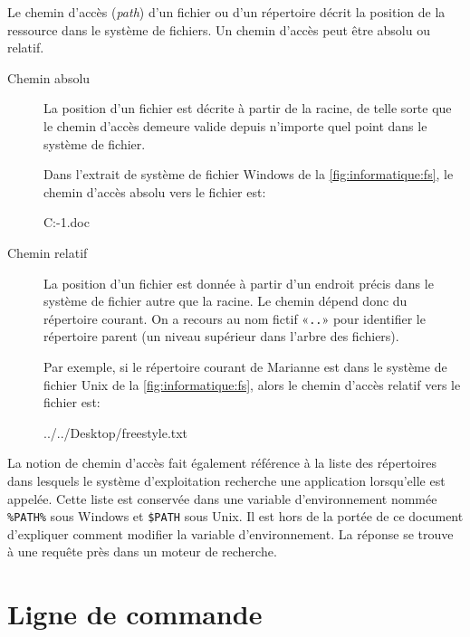 Le chemin d'accès (\emph{path}) d'un fichier ou
d'un répertoire décrit la position de la ressource dans le système de
fichiers. Un chemin d'accès peut être absolu ou relatif.
\begin{description}
\item[Chemin absolu]  La position d'un
  fichier est décrite à partir de la racine, de telle sorte que le
  chemin d'accès demeure valide depuis n'importe quel point dans le
  système de fichier.

  Dans l'extrait de système de fichier Windows de la
  \autoref{fig:informatique:fs}, le chemin d'accès absolu vers le
  fichier  est:
\begin{Schunk}
\begin{Sinput}
C:\Users\Alexandre\Documents\synthese-1.doc
\end{Sinput}
\end{Schunk}
\item[Chemin relatif]  La position d'un
  fichier est donnée à partir d'un endroit précis dans le système de
  fichier autre que la racine. Le chemin dépend donc du répertoire
  courant. On a recours au nom fictif «\verb=..=» pour identifier le
  répertoire parent (un niveau supérieur dans l'arbre des fichiers).

  Par exemple, si le répertoire courant de Marianne est
   dans le système de fichier Unix de la
  \autoref{fig:informatique:fs}, alors le chemin d'accès relatif vers
  le fichier  est:
\begin{Schunk}
\begin{Sinput}
../../Desktop/freestyle.txt
\end{Sinput}
\end{Schunk}
\end{description}

La notion de chemin d'accès fait également référence à la liste des
répertoires dans lesquels le système d'exploitation recherche une
application lorsqu'elle est appelée. Cette liste est conservée dans
une variable d'environnement nommée \verb=%PATH%= sous Windows
et \verb=$PATH= sous Unix. Il est hors de la portée de ce document
d'expliquer comment modifier la variable d'environnement. La réponse
se trouve à une requête près dans un moteur de recherche.


\section{Ligne de commande}
\label{sec:informatique:cli}

